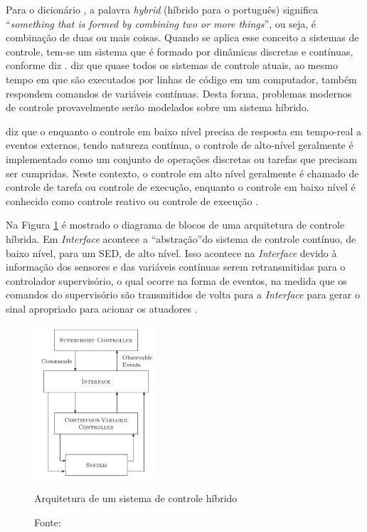 Para o dicionário , a palavra \textit{hybrid} (híbrido para o português) significa 
\textquotedblleft \textit{something that is formed by combining two or more things}\textquotedblright, ou seja, 
é combinação de duas ou mais coisas. Quando se aplica esse conceito a sistemas de controle, tem-se um sistema que é formado 
por dinâmicas discretas e contínuas, conforme diz . 
 diz que quase todos os 
sistemas de controle atuais, ao mesmo tempo em que são executados por linhas de 
código em um computador, também respondem comandos de variáveis contínuas. Desta forma, problemas modernos de controle 
provavelmente serão modelados sobre um sistema híbrido.\par

 diz que o enquanto o controle em baixo nível precisa de resposta em tempo-real a eventos externos, 
tendo natureza contínua, o controle de alto-nível geralmente é implementado como um conjunto de operações discretas ou tarefas que 
precisam ser cumpridas. Neste contexto, o controle em alto nível geralmente é chamado de controle de tarefa ou controle de execução, 
enquanto o controle em baixo nível é conhecido como controle reativo ou controle de execução \cite{dudek_mobile}.

Na Figura \ref{fig:cas} é mostrado o diagrama de blocos de uma arquitetura de controle híbrida. Em \textit{Interface} acontece a 
\textquotedblleft abstração\textquotedblright do sistema de controle contínuo, de baixo nível, para um SED, de alto nível. Isso acontece 
na \textit{Interface} devido à informação dos sensores e das variáveis contínuas serem retransmitidas para o controlador supervisório, 
o qual ocorre na forma de eventos, na medida que os comandos do supervisório são transmitidos de volta para a \textit{Interface} para 
gerar o sinal apropriado para acionar os atuadores \cite{cassandras}.

\begin{figure}[h!]
 \centering
 \captionsetup{width=0.38\textwidth,font=footnotesize,textfont=bf}
 \includegraphics[width=0.4\textwidth,height=0.6\textheight,keepaspectratio]{figuras/hybrid.png}
 \caption{Arquitetura de um sistema de controle híbrido \label{fig:cas}}
 \vspace{-0.3cm}
 \caption*{Fonte: \cite[p.43]{cassandras}}
\end{figure}




